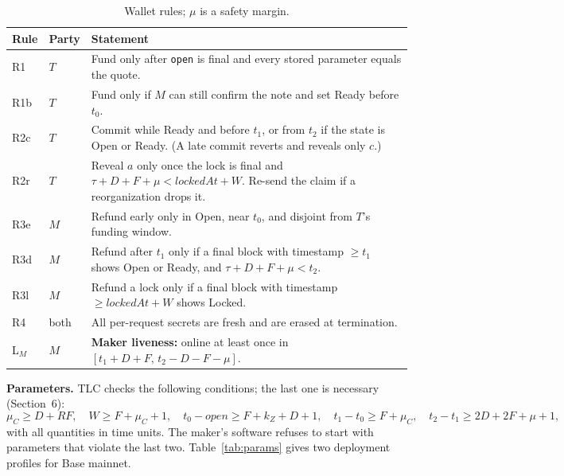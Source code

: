 \documentclass[10pt,letterpaper]{article}
\theoremstyle{plain}
\theoremstyle{definition}
\newcommand{\fn}[1]{\texttt{#1}}
\newcommand{\st}[1]{\textsf{#1}}
\begin{document}
\begin{table}[H]
\centering\small
\begin{tabularx}{\linewidth}{@{}l l X@{}}
\toprule
\textbf{Rule} & \textbf{Party} & \textbf{Statement}\\
\midrule
R1 & $T$ & Fund only after \fn{open} is final and every stored parameter equals the quote.\\
R1b & $T$ & Fund only if $M$ can still confirm the note and set Ready before $t_0$.\\
R2c & $T$ & Commit while Ready and before $t_1$, or from $t_2$ if the state is \st{Open} or \st{Ready}. (A late commit reverts and reveals only $c$.)\\
R2r & $T$ & Reveal $a$ only once the lock is final and $\tau + D + F + \mu < \mathit{lockedAt} + W$. Re-send the claim if a reorganization drops it.\\
R3e & $M$ & Refund early only in \st{Open}, near $t_0$, and disjoint from $T$'s funding window.\\
R3d & $M$ & Refund after $t_1$ only if a final block with timestamp $\ge t_1$ shows \st{Open} or \st{Ready}, and $\tau + D + F + \mu < t_2$.\\
R3l & $M$ & Refund a lock only if a final block with timestamp $\ge \mathit{lockedAt}+W$ shows \st{Locked}.\\
R4 & both & All per-request secrets are fresh and are erased at termination.\\
L$_M$ & $M$ & \textbf{Maker liveness:} online at least once in $[t_1 + D + F,\, t_2 - D - F - \mu]$.\\
\bottomrule
\end{tabularx}
\caption{Wallet rules; $\mu$ is a safety margin.}
\label{tab:rules}
\end{table}

\textbf{Parameters.} TLC checks the following conditions; the last one is necessary
(Section~6):
\[
\mu_C \ge D + R F,\quad W \ge F + \mu_C + 1,\quad t_0 - \mathit{open} \ge F + k_Z + D + 1,\quad t_1 - t_0 \ge F + \mu_C,\quad t_2 - t_1 \ge 2D + 2F + \mu + 1,
\]
with all quantities in time units. The maker's software refuses to start with parameters that
violate the last two. Table~\ref{tab:params} gives two deployment profiles for Base mainnet.
\end{document}
